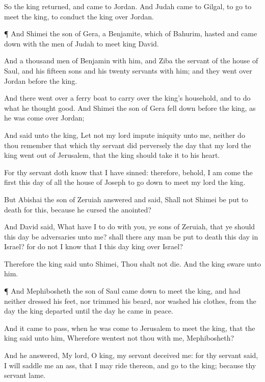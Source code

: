 {So the
king
returned, and
came to
Jordan. And
Judah
came to
Gilgal, to
go to
meet the
king, to
conduct the
king
over
Jordan.


\par }{\PP {}¶ And
Shimei the
son of
Gera, a
Benjamite, which
{} of
Bahurim,
hasted and came
down with the
men of
Judah to
meet
king
David.

And
{} a
thousand
men of
Benjamin with him, and
Ziba the
servant of the
house of
Saul, and his
fifteen
sons and his
twenty
servants with him; and they went
over
Jordan
before the
king.

And there went
over a ferry
boat to carry
over the
king’s
household, and to
do what he
thought
good. And
Shimei the
son of
Gera fell
down
before the
king, as he was come
over
Jordan;

And
said unto the
king, Let not my
lord
impute
iniquity unto me, neither do thou
remember that which thy
servant did
perversely the
day that my
lord the
king went
out of
Jerusalem, that the
king should
take it to his
heart.

For thy
servant doth
know that I have
sinned: therefore, behold, I am
come the
first this
day of all the
house of
Joseph to go
down to
meet my
lord the
king.

But
Abishai the
son of
Zeruiah
answered and
said, Shall not
Shimei be put to
death for this, because he
cursed the
{}
anointed?

And
David
said, What have I to do with you, ye
sons of
Zeruiah, that ye should this
day be
adversaries unto me? shall there any
man be put to
death this
day in
Israel? for do not I
know that I
{} this
day
king over
Israel?

Therefore the
king
said unto
Shimei, Thou shalt not
die. And the
king
sware unto him.


\par }{\PP {}¶ And
Mephibosheth the
son of
Saul came
down to
meet the
king, and had
neither
dressed his
feet, nor
trimmed his
beard, nor
washed his
clothes, from the
day the
king
departed until the
day he
came
{} in
peace.

And it came to pass, when he was
come to
Jerusalem to
meet the
king, that the
king
said unto him, Wherefore
wentest not thou with me,
Mephibosheth?

And he
answered, My
lord, O
king, my
servant
deceived me: for thy
servant
said, I will
saddle me an
ass, that I may
ride thereon, and
go to the
king; because thy
servant
{}
lame.

}
